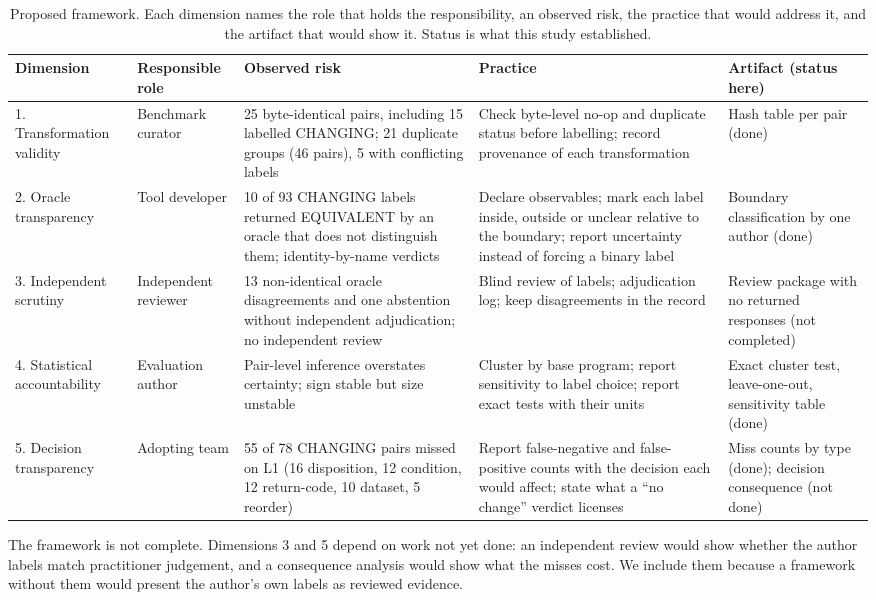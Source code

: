 \documentclass[conference]{IEEEtran}
\begin{document}
\begin{table}[t]
\caption{Proposed framework. Each dimension names the role that holds the responsibility, an observed risk, the practice that would address it, and the artifact that would show it. Status is what this study established.}
\label{tab:framework}
\centering
\small
\begin{tabular}{@{}p{2.2cm}p{2.0cm}p{4.0cm}p{4.0cm}p{3.8cm}@{}}
\toprule
Dimension & Responsible role & Observed risk & Practice & Artifact (status here) \\
\midrule
1. Transformation validity & Benchmark curator & 25 byte-identical pairs, including 15 labelled CHANGING; 21 duplicate groups (46 pairs), 5 with conflicting labels & Check byte-level no-op and duplicate status before labelling; record provenance of each transformation & Hash table per pair (done) \\
2. Oracle transparency & Tool developer & 10 of 93 CHANGING labels returned EQUIVALENT by an oracle that does not distinguish them; identity-by-name verdicts & Declare observables; mark each label inside, outside or unclear relative to the boundary; report uncertainty instead of forcing a binary label & Boundary classification by one author (done) \\
3. Independent scrutiny & Independent reviewer & 13 non-identical oracle disagreements and one abstention without independent adjudication; no independent review & Blind review of labels; adjudication log; keep disagreements in the record & Review package with no returned responses (not completed) \\
4. Statistical accountability & Evaluation author & Pair-level inference overstates certainty; sign stable but size unstable & Cluster by base program; report sensitivity to label choice; report exact tests with their units & Exact cluster test, leave-one-out, sensitivity table (done) \\
5. Decision transparency & Adopting team & 55 of 78 CHANGING pairs missed on L1 (16 disposition, 12 condition, 12 return-code, 10 dataset, 5 reorder) & Report false-negative and false-positive counts with the decision each would affect; state what a ``no change'' verdict licenses & Miss counts by type (done); decision consequence (not done) \\
\bottomrule
\end{tabular}
\end{table}

The framework is not complete. Dimensions 3 and 5 depend on work not yet done: an independent review would show whether the author labels match practitioner judgement, and a consequence analysis would show what the misses cost. We include them because a framework without them would present the author's own labels as reviewed evidence.
\end{document}
